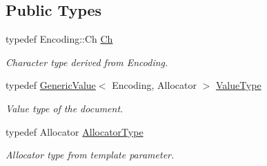 \subsection*{Public Types}
\begin{DoxyCompactItemize}
\item 
typedef Encoding\+::\+Ch \hyperlink{class_generic_document_a6f5b0b7b6626508d094ae67490269700}{Ch}\hypertarget{class_generic_document_a6f5b0b7b6626508d094ae67490269700}{}\label{class_generic_document_a6f5b0b7b6626508d094ae67490269700}

\begin{DoxyCompactList}\small\item\em Character type derived from Encoding. \end{DoxyCompactList}\item 
typedef \hyperlink{class_generic_value}{Generic\+Value}$<$ Encoding, Allocator $>$ \hyperlink{class_generic_document_a8936205dc215dda029060d7e835e0549}{Value\+Type}\hypertarget{class_generic_document_a8936205dc215dda029060d7e835e0549}{}\label{class_generic_document_a8936205dc215dda029060d7e835e0549}

\begin{DoxyCompactList}\small\item\em Value type of the document. \end{DoxyCompactList}\item 
typedef Allocator \hyperlink{class_generic_document_a35155b912da66ced38d22e2551364c57}{Allocator\+Type}\hypertarget{class_generic_document_a35155b912da66ced38d22e2551364c57}{}\label{class_generic_document_a35155b912da66ced38d22e2551364c57}

\begin{DoxyCompactList}\small\item\em Allocator type from template parameter. \end{DoxyCompactList}\end{DoxyCompactItemize}
